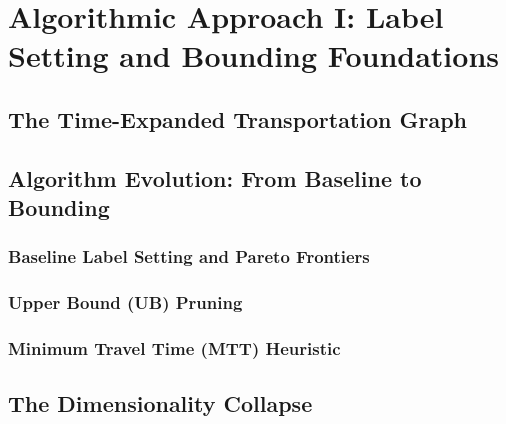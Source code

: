 \chapter{Algorithmic Approach I: Label Setting and Bounding Foundations}
\label{chap:label_setting_approach}

\section{The Time-Expanded Transportation Graph}
\label{sec:time_expanded_graph}

\section{Algorithm Evolution: From Baseline to Bounding}
\label{sec:algorithm_evolution}

\subsection{Baseline Label Setting and Pareto Frontiers}
\label{subsec:baseline_label_setting}

\subsection{Upper Bound (UB) Pruning}
\label{subsec:ub_pruning}

\subsection{Minimum Travel Time (MTT) Heuristic}
\label{subsec:mtt_heuristic}

\section{The Dimensionality Collapse}
\label{sec:dimensionality_collapse}
